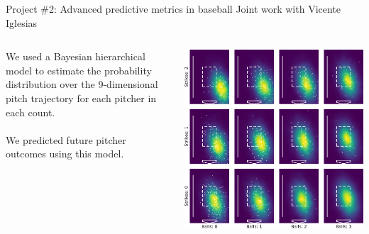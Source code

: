 \documentclass{beamer}
\begin{document}
\begin{frame}{Project \#2: Advanced predictive metrics in baseball}
  {Joint work with Vicente Iglesias}
  \begin{columns}
    \begin{column}{0.35\textwidth}
      We used a Bayesian hierarchical model to estimate the probability distribution over the 9-dimensional pitch trajectory for each pitcher in each count.\\
      ~\\
      We predicted future pitcher outcomes using this model.
    \end{column}
    \begin{column}{0.65\textwidth}
      \includegraphics[height = \textwidth]{images/656302_SL_R_plate.png}
    \end{column}
  \end{columns}
\end{frame}
\end{document}
